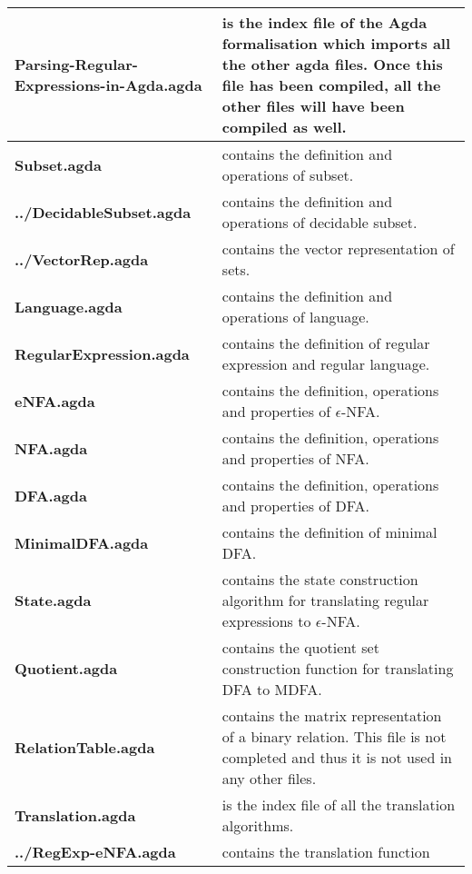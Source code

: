 \begin{center}
\begin{longtable}{| p{5.2cm} | p{8.3cm} |}
\hline
\textbf{Parsing-Regular-Expressions-in-Agda.agda} & is the index
file of the Agda formalisation which imports all the other agda
files. Once this file has been compiled, all the other files will have been compiled as
well. \\ \hline 
\textbf{Subset.agda} & contains the definition and operations of subset. \\
  \hline
\textbf{../DecidableSubset.agda} & contains the definition and operations
                              of decidable subset. \\ \hline
\textbf{../VectorRep.agda} & contains the vector representation of sets. \\
  \hline
\textbf{Language.agda} & contains the definition and operations of language. \\
  \hline 
\textbf{RegularExpression.agda} & contains the definition of regular expression
                         and regular language. \\ \hline
\textbf{eNFA.agda} & contains the definition, operations and properties of
       \(\epsilon\)-NFA. \\ \hline
\textbf{NFA.agda} & contains the definition, operations and properties of
       NFA. \\ \hline
\textbf{DFA.agda} & contains the definition, operations and properties of
       DFA. \\ \hline
\textbf{MinimalDFA.agda} & contains the definition of minimal DFA. \\
  \hline 
\textbf{State.agda} & contains the state construction algorithm for
                      translating regular expressions to
                      \(\epsilon\)-NFA. \\ \hline
\textbf{Quotient.agda} & contains the quotient set construction
                         function for translating DFA to MDFA. \\
  \hline 
\textbf{RelationTable.agda} & contains the matrix representation of
                              a binary relation. This file is not
                              completed and thus it is not used in any
                              other files. \\ \hline
\textbf{Translation.agda} & is the index file of all the translation
                       algorithms. \\ \hline
\textbf{../RegExp-eNFA.agda} & contains the translation function

\end{longtable}
\end{center}
